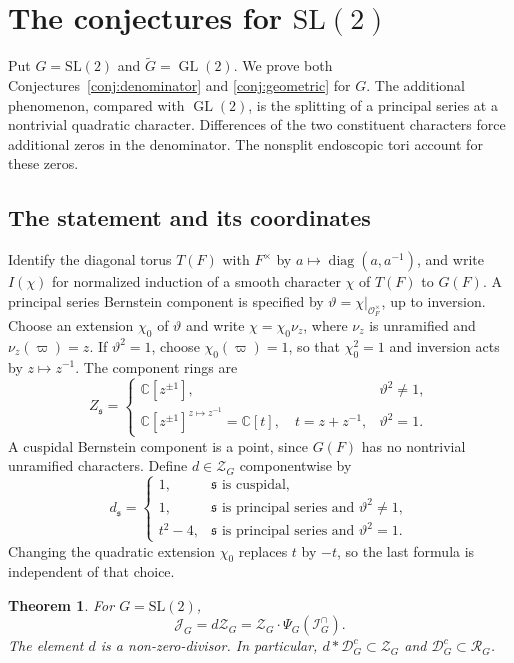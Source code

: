 \documentclass[11pt,a4paper]{amsart}
\newcommand{\mcD}{\mathcal D}
\newcommand{\mcZ}{\mathcal Z}
\newcommand{\mcR}{\mathcal R}
\newcommand{\mcJ}{\mathcal J}
\newtheorem{theorem}{Theorem}[section]
\theoremstyle{definition}
\theoremstyle{remark}
\DeclareMathOperator{\GL}{GL}
\newcommand{\grs}{\mathfrak s}
\newcommand{\Icap}{\mathcal I^{\cap}}
\begin{document}
\section{The conjectures for \texorpdfstring{$\mathrm{SL}(2)$}{SL(2)}}\label{sec:sl2}
Put $G=\mathrm{SL}(2)$ and $\widetilde G=\GL(2)$. We prove both
Conjectures~\ref{conj:denominator} and \ref{conj:geometric} for $G$.
The additional phenomenon, compared with $\GL(2)$, is the splitting
of a principal series at a nontrivial quadratic character. Differences
of the two constituent characters force additional zeros in the
denominator. The nonsplit endoscopic tori account for these zeros.

\subsection{The statement and its coordinates}
Identify the diagonal torus $T(F)$ with $F^\times$ by
$a\mapsto\operatorname{diag}(a,a^{-1})$, and write $I(\chi)$ for
normalized induction of a smooth character $\chi$ of $T(F)$ to
$G(F)$. A principal series Bernstein component is specified by
$\vartheta=\chi|_{\mathcal O_F^\times}$, up to inversion.
Choose an extension $\chi_0$ of $\vartheta$ and write
$\chi=\chi_0\nu_z$, where $\nu_z$ is unramified and
$\nu_z(\varpi)=z$. If $\vartheta^2=1$, choose
$\chi_0(\varpi)=1$, so that $\chi_0^2=1$ and inversion acts by
$z\mapsto z^{-1}$. The component rings are
$$
 Z_{\grs}=\begin{cases}
   \mathbb C[z^{\pm1}],&\vartheta^2\ne1,\\
   \mathbb C[z^{\pm1}]^{z\mapsto z^{-1}}=\mathbb C[t],
       \quad t=z+z^{-1},&\vartheta^2=1.
 \end{cases}
$$
A cuspidal Bernstein component is a point, since $G(F)$ has no
nontrivial unramified characters. Define $d\in\mcZ_G$ componentwise by
\begin{equation}\label{eq:sl2-denominator}
 d_{\grs}=\begin{cases}
  1,&\grs\text{ is cuspidal},\\
  1,&\grs\text{ is principal series and }\vartheta^2\ne1,\\
  t^2-4,&\grs\text{ is principal series and }\vartheta^2=1.
 \end{cases}
\end{equation}
Changing the quadratic extension $\chi_0$ replaces $t$ by $-t$,
so the last formula is independent of that choice.

\begin{theorem}\label{T:sl2}
For $G=\mathrm{SL}(2)$,
$$
 {\mcJ_G=d\mcZ_G
          =\mcZ_G\cdot\Psi_G(\Icap_G).}
$$
The element $d$ is a non-zero-divisor. In particular,
$d*\mcD_G^c\subset\mcZ_G$ and $\mcD_G^c\subset\mcR_G$.
\end{theorem}
\end{document}
